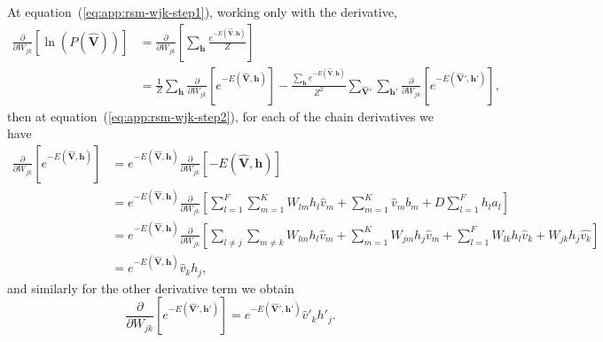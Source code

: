 At equation~(\ref{eq:app:rsm-wjk-step1}), working only with the derivative,
\begin{align}
    \frac{\partial}{\partial W_{jk}} \left[ \ln\left(P(\mathbf{\hat{V}})\right) \right] &= \frac{\partial}{\partial W_{jk}} \left[ \sum_{\mathbf{h}} \frac{e^{-E(\mathbf{\hat{V}}, \mathbf{h})}}{Z} \right] \nonumber \\ %
    \label{eq:app:rsm-wjk-step2}
    &= \frac{1}{Z} \sum_{\mathbf{h}} \frac{\partial}{\partial W_{jk}} \left[ e^{-E(\mathbf{\hat{V}}, \mathbf{h})} \right] - \frac{\sum_{\mathbf{h}} e^{-E(\mathbf{\hat{V}}, \mathbf{h})}}{Z^{2}} \sum_{\mathbf{\hat{V}}'} \sum_{\mathbf{h}'} \frac{\partial}{\partial W_{jk}} \left[ e^{-E(\mathbf{\hat{V}}', \mathbf{h}')} \right],
\end{align}
then at equation~(\ref{eq:app:rsm-wjk-step2}), for each of the chain derivatives we have
\begin{align}
    \frac{\partial}{\partial W_{jk}} \left[ e^{-E(\mathbf{\hat{V}}, \mathbf{h})} \right] &= e^{-E(\mathbf{\hat{V}}, \mathbf{h})} \frac{\partial}{\partial W_{jk}} \left[ -E(\mathbf{\hat{V}}, \mathbf{h}) \right] \nonumber \\ %
    &= e^{-E(\mathbf{\hat{V}}, \mathbf{h})} \frac{\partial}{\partial W_{jk}} \left[ \sum^{F}_{l=1} \sum^{K}_{m=1} W_{lm} h_{l} \hat{v}_{m} + \sum^{K}_{m=1} \hat{v}_{m} b_{m} + D \sum^{F}_{l=1} h_{l} a_{l} \right] \nonumber \\ %
    &= e^{-E(\mathbf{\hat{V}}, \mathbf{h})} \frac{\partial}{\partial W_{jk}} \left[ \sum_{l\neq j} \sum_{m \neq k} W_{lm} h_{l} \hat{v}_{m} + \sum^{K}_{m=1} W_{jm} h_{j} \hat{v}_{m} + \sum^{F}_{l=1} W_{lk} h_{l} \hat{v}_{k} + W_{jk} h_{j} \hat{v_{k}} \right] \nonumber \\ %
    \label{eq:app:rsm-wjk-step3}
    &= e^{-E(\mathbf{\hat{V}}, \mathbf{h})} \hat{v}_{k} h_{j}, 
\end{align}
and similarly for the other derivative term we obtain
\begin{equation}
    \label{eq:app:rsm-wjk-step4}
    \frac{\partial}{\partial W_{jk}} \left[ e^{-E(\mathbf{\hat{V}}', \mathbf{h}')} \right] = e^{-E(\mathbf{\hat{V}}', \mathbf{h}')} \hat{v}'_{k} h'_{j}.  
\end{equation}

